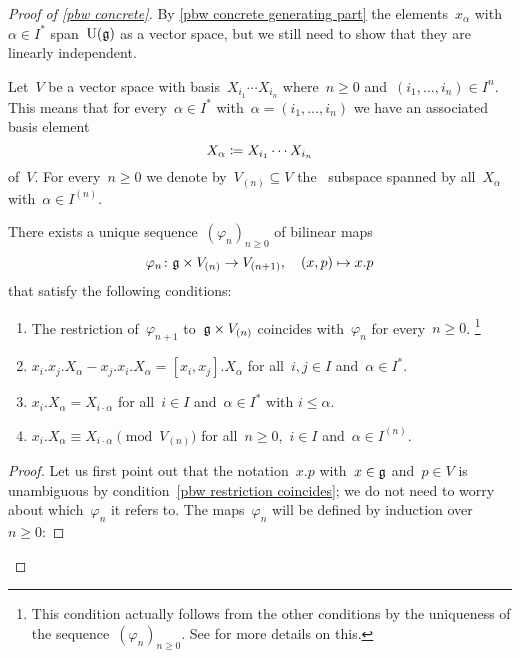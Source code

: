 \begin{proof}[Proof of \cref{pbw concrete}]
  By \cref{pbw concrete generating part} the elements~$x_\alpha$ with~$\alpha \in I^*$ span~$\operatorname{U}(\mathfrak{g})$ as a vector space, but we still need to show that they are linearly independent.
  
  Let~$V$ be a vector space with basis~$X_{i_1} \dotsm X_{i_n}$ where~$n \geq 0$ and~$(i_1, \dotsc, i_n) \in I^n$.
  This means that for every~$\alpha \in I^*$ with~$\alpha = (i_1, \dotsc, i_n)$ we have an associated basis element
  \[
    X_\alpha
    \coloneqq
    X_{i_1} \dotsm X_{i_n}
  \]
  of~$V$.
  For every~$n \geq 0$ we denote by~$V_{(n)} \subseteq V$ the~{\linear{$\kf$}} subspace spanned by all~$X_\alpha$ with~$\alpha \in I^{(n)}$.

  \begin{claim*}
    There exists a unique sequence~$(\varphi_n)_{n \geq 0}$ of bilinear maps
    \[
      \varphi_n
      \colon
      \mathfrak{g} \times V_{(n)}
      \to
      V_{(n+1)},
      \quad
      (x,p)
      \mapsto
      x.p
    \]
    that satisfy the following conditions:
    \begin{enumerate}
    \item
      \label{pbw restriction coincides}
      The restriction of~$\varphi_{n+1}$ to~$\mathfrak{g} \times V_{(n)}$ coincides with~$\varphi_n$ for every~$n \geq 0$.%
      \footnote{This condition actually follows from the other conditions by the uniqueness of the sequence~$(\varphi_n)_{n \geq 0}$.
    See \cite[\S 17.4]{Humphreys} for more details on this.}
    \item
      \label{pbw representation of lie algebra}
      $x_i.x_j.X_\alpha - x_j.x_i.X_\alpha = [x_i, x_j].X_\alpha$ for all~$i,j \in I$ and~$\alpha \in I^*$.
    \item
      \label{pbw essential condition}
      $x_i.X_\alpha = X_{i \cdot \alpha}$ for all~$i \in I$ and~$\alpha \in I^*$ with $i \leq \alpha$.
    \item
      \label{pbw technical detail for construction}
      $x_i.X_\alpha \equiv X_{i \cdot \alpha} \pmod{V_{(n)}}$ for all~$n \geq 0$,~$i \in I$ and~$\alpha \in I^{(n)}$.
    \end{enumerate}
 \end{claim*}

  \begin{proof}
    Let us first point out that the notation~$x.p$ with~$x \in \mathfrak{g}$ and~$p \in V$ is unambiguous by condition~\ref{pbw restriction coincides};
    we do not need to worry about which~$\varphi_n$ it refers to.
    The maps~$\varphi_n$ will be defined by induction over~$n \geq 0$:
    

\end{proof}
\end{proof}
